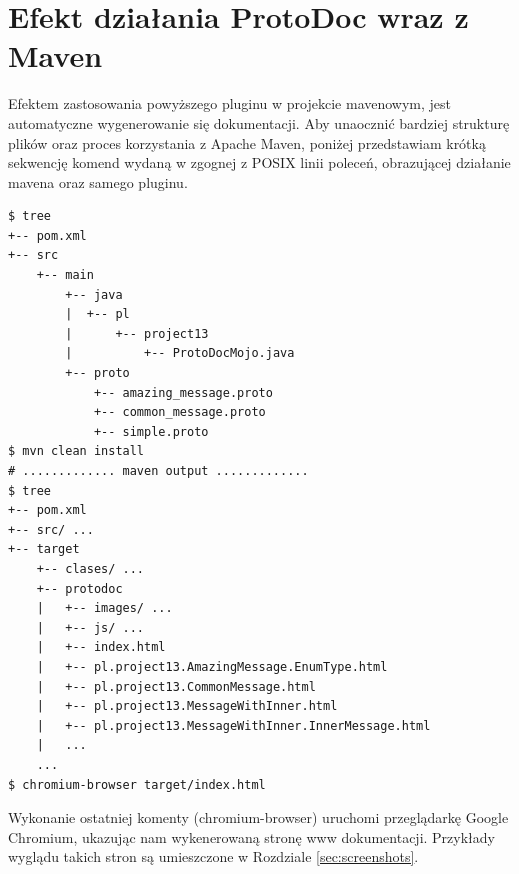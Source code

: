 \documentclass[pdflatex,11pt]{aghdpl}
\begin{document}
\section{Efekt działania ProtoDoc wraz z Maven}
Efektem zastosowania powyższego pluginu w projekcie mavenowym, jest automatyczne wygenerowanie się dokumentacji.
Aby unaocznić bardziej strukturę plików oraz proces korzystania z Apache Maven, poniżej przedstawiam krótką sekwencję komend
wydaną w zgognej z POSIX linii poleceń, obrazującej działanie mavena oraz samego pluginu.

\begin{verbatim}
$ tree
+-- pom.xml
+-- src
    +-- main
        +-- java
        |  +-- pl
        |      +-- project13
        |          +-- ProtoDocMojo.java
        +-- proto
            +-- amazing_message.proto
            +-- common_message.proto
            +-- simple.proto
$ mvn clean install
# ............. maven output .............
$ tree
+-- pom.xml
+-- src/ ...
+-- target
    +-- clases/ ...
    +-- protodoc
    |   +-- images/ ...
    |   +-- js/ ...
    |   +-- index.html 
    |   +-- pl.project13.AmazingMessage.EnumType.html
    |   +-- pl.project13.CommonMessage.html
    |   +-- pl.project13.MessageWithInner.html
    |   +-- pl.project13.MessageWithInner.InnerMessage.html
    |   ...
    ...
$ chromium-browser target/index.html
\end{verbatim}

Wykonanie ostatniej komenty (chromium-browser) uruchomi przeglądarkę Google Chromium, ukazując nam wykenerowaną stronę www dokumentacji.
Przykłady wyglądu takich stron są umieszczone w Rozdziale \ref{sec:screenshots}.


\appendix





\end{document}
